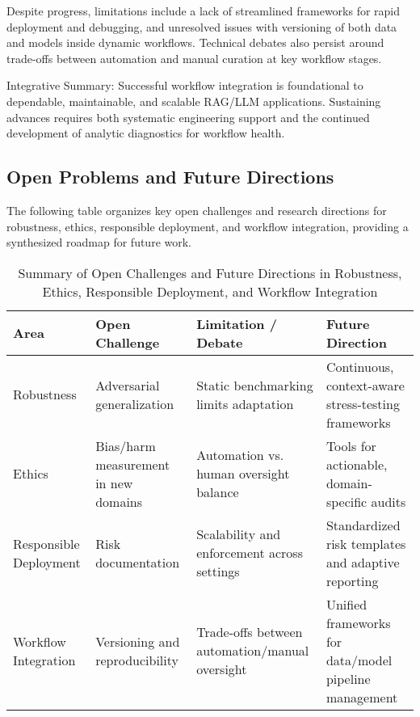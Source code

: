 \documentclass[sigconf]{acmart}
\begin{document}
Despite progress, limitations include a lack of streamlined frameworks for rapid deployment and debugging, and unresolved issues with versioning of both data and models inside dynamic workflows. Technical debates also persist around trade-offs between automation and manual curation at key workflow stages.

Integrative Summary: Successful workflow integration is foundational to dependable, maintainable, and scalable RAG/LLM applications. Sustaining advances requires both systematic engineering support and the continued development of analytic diagnostics for workflow health.

\subsection{Open Problems and Future Directions}
The following table organizes key open challenges and research directions for robustness, ethics, responsible deployment, and workflow integration, providing a synthesized roadmap for future work.

\begin{table*}[htbp]
\centering
\caption{Summary of Open Challenges and Future Directions in Robustness, Ethics, Responsible Deployment, and Workflow Integration}
\label{tab:open_challenges}
\begin{adjustbox}{max width=\textwidth}
\begin{tabular}{@{}llll@{}}
\toprule
\textbf{Area} & \textbf{Open Challenge} & \textbf{Limitation / Debate} & \textbf{Future Direction} \\
\midrule
Robustness & Adversarial generalization & Static benchmarking limits adaptation & Continuous, context-aware stress-testing frameworks \\
Ethics & Bias/harm measurement in new domains & Automation vs. human oversight balance & Tools for actionable, domain-specific audits \\
Responsible Deployment & Risk documentation & Scalability and enforcement across settings & Standardized risk templates and adaptive reporting \\
Workflow Integration & Versioning and reproducibility & Trade-offs between automation/manual oversight & Unified frameworks for data/model pipeline management \\
\bottomrule
\end{tabular}
\end{adjustbox}
\end{table*}
\end{document}
